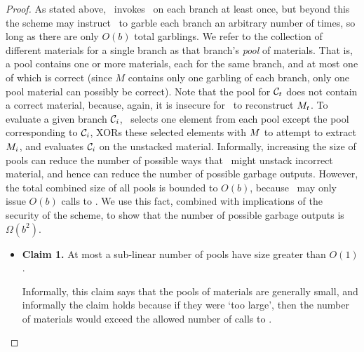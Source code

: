 \begin{proof}
As stated above, \Eval\ invokes \Gb\ on each branch at least once, but beyond this the
scheme may instruct \Eval\ to garble each branch an arbitrary number of
times, so long as there are only $O(b)$ total garblings.
%
We refer to the collection of different materials for a single branch
as that branch's \emph{pool} of materials.
That is, a pool contains one or more materials, each for the same branch,
and at most one of which is correct (since $M$ contains only one
garbling of each branch, only one pool material can possibly be
correct). Note that the pool for $\mathcal C_t$ does not contain a correct
material, because, again, it is insecure for \Eval\ to reconstruct
$M_t$.
%
To evaluate a given branch $\mathcal C_i$, \Eval\ selects one element from
each pool except the pool corresponding to $\mathcal C_i$, XORs these
selected
elements with $M$ to attempt to extract $M_i$, and evaluates
$\mathcal C_i$ on the unstacked material.
%
Informally, increasing the size of pools can reduce
the number of possible ways that \Eval\ might unstack incorrect
material, and hence can reduce the number of possible garbage outputs.
%
However, the total combined size of all pools is bounded to $O(b)$,
because \Eval\ may only issue $O(b)$ calls to \Gb.
We use this fact, combined with implications of the security of the
scheme, to show that the number of possible garbage outputs is
$\Omega(b^2)$.


\begin{itemize}
  \item \textbf{Claim 1.} At most a sub-linear number of pools have
    size greater than $O(1)$.
    \begin{subproof}
      Informally, this claim says that the pools of materials are
      generally small, and informally the claim holds because if they
      were `too large', then the number of materials would exceed the
      allowed number of calls to \Gb.


\end{subproof}
\end{itemize}
\end{proof}

